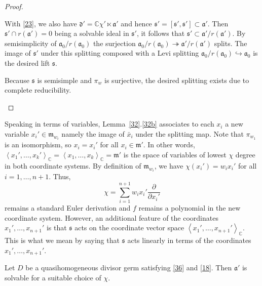 \begin{proof}\
\begin{asparaenum}[(a)]
\item With \eqref{23}, we also have ${\mathfrak{d}}'={\mathds{C}}\chi'\ltimes{\mathfrak{a}}'$ and hence ${\mathfrak{s}}'=[{\mathfrak{s}}',{\mathfrak{s}}']\subset{\mathfrak{a}}'$.
Then ${\mathfrak{s}}'\cap r({\mathfrak{a}}')=0$ being a solvable ideal in ${\mathfrak{s}}'$, it follows that ${\mathfrak{s}}'\subset{\mathfrak{a}}'/r({\mathfrak{a}}')$.
By semisimplicity of ${\mathfrak{a}}_0/r({\mathfrak{a}}_0)$ the surjection ${\mathfrak{a}}_0/r({\mathfrak{a}}_0){\twoheadrightarrow}{\mathfrak{a}}'/r({\mathfrak{a}}')$ splits.
The image of ${\mathfrak{s}}'$ under this splitting composed with a Levi splitting ${\mathfrak{a}}_0/r({\mathfrak{a}}_0){\hookrightarrow}{\mathfrak{a}}_0$ is the desired lift ${\mathfrak{s}}$.
\item Because ${\mathfrak{s}}$ is semisimple and $\pi_w$ is surjective, the desired splitting exists due to complete reducibility. 
\end{asparaenum}
\end{proof}

Speaking in terms of variables, Lemma~\ref{32}.\eqref{32b} associates to each $x_i$ a new variable $x_i'\in {\mathfrak{m}}_{w_i}$ namely the image of $\bar x_i$ under the splitting map. 
Note that $\pi_{w_1}$ is an isomorphism, so $x_i=x_i'$ for all $x_i\in{\mathfrak{m}}'$. 
In other words, ${{\left\langle{x_1',\dots,x_k'}\right\rangle}}_{\mathds{C}}={{\left\langle{x_1,\dots,x_k}\right\rangle}}_{\mathds{C}}={\mathfrak{m}}'$ is the space of variables of lowest $\chi$ degree in both coordinate systems.
By definition of ${\mathfrak{m}}_{w_i}$, we have $\chi(x_i')=w_ix_i'$ for all $i=1,\dots,n+1$.
Thus,
\[
\chi=\sum_{i=1}^{n+1}w_ix_i'\frac{\partial}{{\partial} x_i'}
\]
remains a standard Euler derivation and $f$ remains a polynomial in the new coordinate system.
However, an additional feature of the coordinates $x_1',\dots,x_{n+1}'$ is that ${\mathfrak{s}}$ acts on the coordinate vector space ${{\left\langle{x_1',\dots,x_{n+1}'}\right\rangle}}_{\mathds{C}}$.
This is what we mean by saying that ${\mathfrak{s}}$ acts linearly in terms of the coordinates $x_1',\dots,x_{n+1}'$.

\begin{prp}\label{33}
Let $D$ be a quasihomogeneous divisor germ satisfying \eqref{36} and \eqref{18}.
Then ${\mathfrak{a}}'$ is solvable for a suitable choice of $\chi$.
\end{prp}

